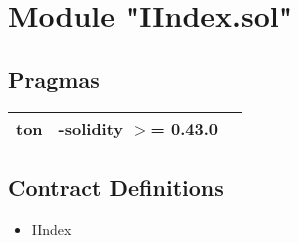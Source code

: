 
\section{Module "IIndex.sol"}


\subsection{Pragmas}


\noindent\begin{tabular}{|l|l|p{5cm}|}\hline
ton & -solidity $>$= 0.43.0 &\\\hline
\end{tabular}


\subsection{Contract Definitions}

\begin{itemize}
\item IIndex
\end{itemize}
